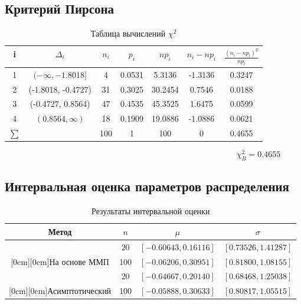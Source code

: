 \documentclass[a4]{article}
\begin{document}
\subsection{Критерий Пирсона}
\begin{table}[H]
\caption{Таблица вычислений $\chi^2$}
\label{tab:my_label1}
\begin{center}
\vspace{5mm}
\begin{tabular}{|c|c|c|c|c|c|c|}
\hline
 i & $\Delta_i$ & $n_i$ & $p_i$ & $np_i$ & $n_i-np_i$ & $\frac{(n_i-np_i)^2}{np_i}$\\
\hline
1&	 $(-\infty, -1.8018]$ &	4  &	 0.0531	& 5.3136 &	 -1.3136 &	 0.3247\\
\hline
2&	(-1.8018, -0.4727)&	31&	 0.3025&	 30.2454&	 0.7546&	 0.0188\\
\hline
3& (-0.4727, 0.8564)&	47&	 0.4535&	 45.3525& 1.6475&	 0.0599\\
\hline
4&	$(0.8564, \infty)$&	18&	 0.1909&	 19.0886&	 -1.0886&	 0.0621\\
\hline
$\sum$&&		100&	1&	100&0&0.4655	\\

\hline
\end{tabular}
\end{center}
\end{table}

$$\chi_B^2= 0.4655$$

\subsection{Интервальная оценка параметров распределения} %
\label{sub:интервальная_оценка_параметров_распределения}
\begin{table}[H]
\caption{Результаты интервальной оценки}
\label{tab:my_label1}
\begin{center}
\vspace{5mm}
\begin{tabular}{|c|c|c|c|}
\hline
Метод & $n$&$\mu$&$\sigma$\\
\hline
&$20$&	$[-0.60643, 0.16116]$&		$[0.73526, 1.41287]$ \\
\cline{2-4}
\raisebox{1.5ex}[0cm][0cm]{На основе ММП}&100&	$[-0.06206, 0.30951]$&		$[0.81800, 1.08155]$\\
\hline
&20&	$[-0.64667,0.20140]$&		$[0.68468, 1.25038]$ \\
\cline{2-4}
\raisebox{1.5ex}[0cm][0cm]{Асимптотический}&100	&$[-0.05888, 0.30633]$&	$[0.80817, 1.05515]$\\
\hline
\end{tabular}
\end{center}
\end{table}
\newpage
\end{document}
